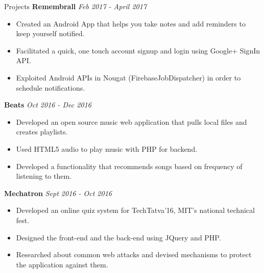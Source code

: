 \documentclass{resume} %
\begin{document}
\begin{rSection}{Projects}
{\bf Remembrall}
\hfill {\em Feb 2017 - April 2017} 
\begin{itemize}
    \itemsep0em 
  \item Created an Android App that helps you take notes and add reminders to keep yourself notified.
  \item Facilitated a quick, one touch account signup and login using Google+ SignIn API.
  \item Exploited Android APIs in Nougat (FirebaseJobDispatcher) in order to schedule notifications.
\end{itemize}
{\bf Beats}
\hfill {\em  Oct 2016 - Dec 2016} 
\begin{itemize}
  \item Developed an open source music web application that pulls local files and creates playlists.
  \item Used HTML5 audio to play music with PHP for backend.
  \item Developed a functionality that recommends songs based on frequency of listening to them.
\end{itemize}
{\bf Mechatron}
\hfill {\em Sept 2016 - Oct 2016}
\begin{itemize}
  \item Developed an online quiz system for TechTatva’16, MIT’s national technical fest.
  \item Designed the front-end and the back-end using JQuery and PHP. 
  \item Researched about common web attacks and devised mechanisms to protect the application against them.
\end{itemize}

\end{rSection}
\end{document}

